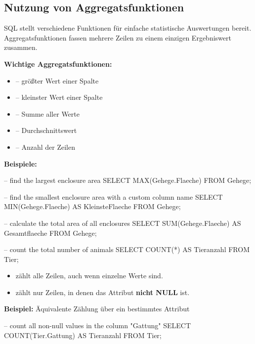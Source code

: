 \subsection{Nutzung von Aggregatsfunktionen}

    SQL stellt verschiedene Funktionen für einfache statistische Auswertungen bereit.  
    Aggregatsfunktionen fassen mehrere Zeilen zu einem einzigen Ergebniswert zusammen.

    \textbf{Wichtige Aggregatsfunktionen:}
    \begin{itemize}
        \item {} – größter Wert einer Spalte
        \item {} – kleinster Wert einer Spalte
        \item {} – Summe aller Werte
        \item {} – Durchschnittswert
        \item {} – Anzahl der Zeilen
    \end{itemize}

    \textbf{Beispiele:}
    \begin{sql}
    -- find the largest enclosure area
    SELECT MAX(Gehege.Flaeche)
    FROM Gehege;

    -- find the smallest enclosure area with a custom column name
    SELECT MIN(Gehege.Flaeche) AS KleinsteFlaeche
    FROM Gehege;

    -- calculate the total area of all enclosures
    SELECT SUM(Gehege.Flaeche) AS Gesamtflaeche
    FROM Gehege;

    -- count the total number of animals
    SELECT COUNT(*) AS Tieranzahl
    FROM Tier;
    \end{sql}

    \begin{tcolorbox}[blue={Hinweis zu \rCode{COUNT}}]
        \begin{itemize}
            \item {} zählt alle Zeilen, auch wenn einzelne Werte  sind.
            \item {} zählt nur Zeilen, in denen das Attribut \textbf{nicht NULL} ist.
        \end{itemize}
    \end{tcolorbox}

    \textbf{Beispiel:} Äquivalente Zählung über ein bestimmtes Attribut
    \begin{sql}
    -- count all non-null values in the column "Gattung"
    SELECT COUNT(Tier.Gattung) AS Tieranzahl
    FROM Tier;
    \end{sql}


